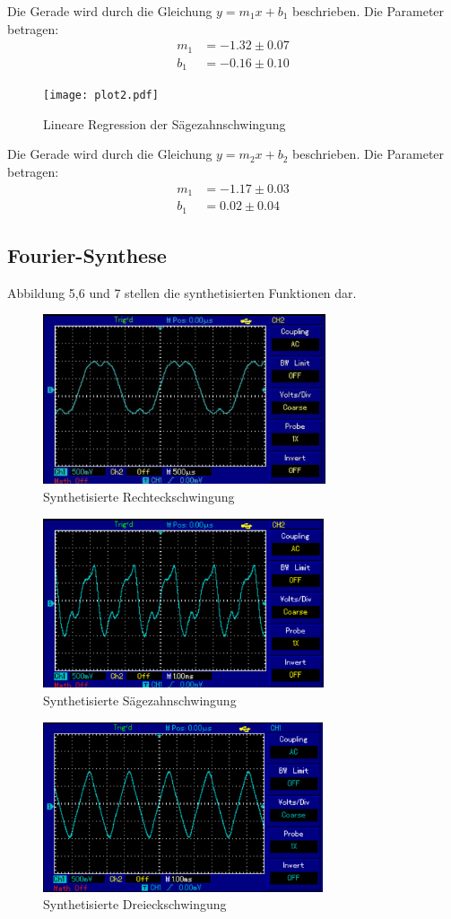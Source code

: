 Die Gerade wird durch die Gleichung $y = m_1x + b_1$ beschrieben. Die Parameter betragen:
\begin{align*}
  m_1 &= -1.32 \pm 0.07 \\
  b_1 &= -0.16 \pm 0.10
\end{align*}

\begin{figure}
  \centering
  \texttt{[image: plot2.pdf]}
  \caption{Lineare Regression der Sägezahnschwingung}
  \label{fig:saegezahn}
\end{figure}

Die Gerade wird durch die Gleichung $y = m_2x + b_2$ beschrieben. Die Parameter betragen:
\begin{align*}
  m_1 &= -1.17 \pm 0.03 \\
  b_1 &= 0.02 \pm 0.04
\end{align*}



\subsection{Fourier-Synthese}
Abbildung 5,6 und 7 stellen die synthetisierten Funktionen dar.

\begin{figure}[H]
  \centering
  \includegraphics[height=5cm]{rechteck.PNG}
  \caption{Synthetisierte Rechteckschwingung}
  \label{fig:rechteck}
\end{figure}


\begin{figure}[H]
  \centering
  \includegraphics[height=5cm]{saegezahn.PNG}
  \caption{Synthetisierte Sägezahnschwingung}
  \label{fig:saegezahn}
\end{figure}


\begin{figure}[H]
  \centering
  \includegraphics[height=5cm]{dreieck.PNG}
  \caption{Synthetisierte Dreieckschwingung}
  \label{fig:dreieck}
\end{figure}
